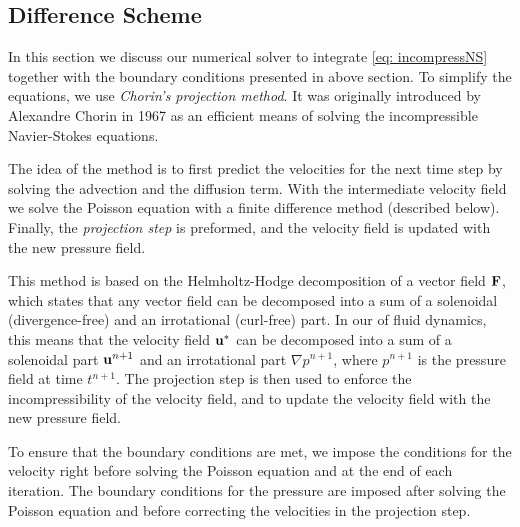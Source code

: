 \subsection{Difference Scheme} \label{sec: diffScheme}
In this section we discuss our numerical solver to integrate \cref{eq: incompressNS} together with the boundary conditions presented in above section. To simplify the equations, we use \textit{Chorin's projection method}. It was originally introduced by Alexandre Chorin in 1967 \cite{Chorin1967NumericalNS} as an efficient means of solving the incompressible Navier-Stokes equations.

The idea of the method is to first predict the velocities for the next time step by solving the advection and the diffusion term. With the intermediate velocity field we solve the Poisson equation with a finite difference method (described below). Finally, the \textit{projection step} is preformed, and the velocity field is updated with the new pressure field.

This method is based on the Helmholtz-Hodge decomposition of a vector field $\boldsymbol{\mathrm{F}}$, which states that any vector field can be decomposed into a sum of a solenoidal (divergence-free) and an irrotational (curl-free) part. In our of fluid dynamics, this means that the velocity field $\boldsymbol{\mathrm{u}}^*$ can be decomposed into a sum of a solenoidal part $\boldsymbol{\mathrm{u}}^{n+1}$ and an irrotational part $\nabla p^{n+1}$, where $p^{n+1}$ is the pressure field at time $t^{n+1}$. The projection step is then used to enforce the incompressibility of the velocity field, and to update the velocity field with the new pressure field.

To ensure that the boundary conditions are met, we impose the conditions for the velocity right before solving the Poisson equation and at the end of each iteration. The boundary conditions for the pressure are imposed after solving the Poisson equation and before correcting the velocities in the projection step.

